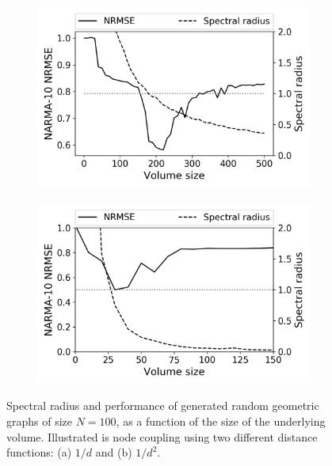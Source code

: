 \begin{figure}[t!]
  \centering
  \begin{subfigure}{.49\textwidth}
    \centering
    \includegraphics[width=1.0\linewidth]{figures/RGG-volume-size-inv.png}
    \caption{}
    \label{fig:size-graph-volume-a}
  \end{subfigure}
  \begin{subfigure}{.49\textwidth}
    \centering
    \includegraphics[width=1.0\linewidth]{figures/RGG-volume-size-inv-squared.png}
    \caption{}
    \label{fig:size-graph-volume-b}
  \end{subfigure}
  \caption{
    Spectral radius and performance of generated random geometric graphs of size
$N = 100$, as a function of the size of the underlying volume. Illustrated is
node coupling using two different distance functions: (a) $1/d$ and (b) $1/d^2$.
  }
  \label{fig:size-graph-volume}
\end{figure}

